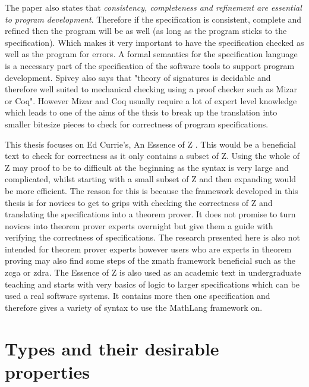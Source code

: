 The paper also states that \textit{consistency, completeness and refinement are essential to program development}. Therefore if the specification is consistent, complete and refined then the program will be as well (as long as the program sticks to the specification). Which makes it very important to have the specification checked as well as the program for errors. A formal semantics for the specification language is a necessary part of the specification of the software tools to support program development. Spivey also says that "theory  of signatures is decidable and therefore well suited to mechanical checking using a proof checker such as Mizar or Coq". However Mizar and Coq usually require a lot of expert level knowledge which leads to one of the aims of the thsis to break up the translation into smaller bitesize pieces to check for correctness of program specifications.

This thesis focuses on Ed Currie's, An Essence of Z \cite{essenceofz}. This would be a beneficial text to check for correctness as it only contains a subset of Z. Using the whole of Z may proof to be to difficult at the beginning as the syntax is very large and complicated, whilst starting with a small subset of Z and then expanding would be more efficient. The reason for this is because the framework developed in this thesis is for novices to get to grips with checking the correctness of Z and translating the specifications into a theorem prover. It does not promise to turn novices into theorem prover experts overnight but give them a guide with verifying the correctness of specifications. The research presented here is also not intended for theorem prover experts however users who are experts in theorem proving may also find some steps of the \gls{zmath} framework beneficial such as the \gls{zcga} or \gls{zdra}. The Essence of Z is also used as an academic text in undergraduate teaching and starts with very basics of logic to larger specifications which can be used a real software systems. It contains more then one specification and therefore gives a variety of syntax to use the MathLang framework on.

\section{Types and their desirable properties}

